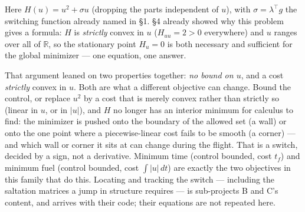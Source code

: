 \documentclass[11pt]{article}
\newcommand{\R}{\mathbb{R}}
\begin{document}
\begin{rig}
Here $H(u) = u^2 + \sigma u$ (dropping the parts independent of $u$), with
$\sigma = \lambda^\top g$ the switching function already named in \S1. \S4
already showed why this problem gives a formula: $H$ is \emph{strictly}
convex in $u$ ($H_{uu}=2>0$ everywhere) and $u$ ranges over all of $\R$, so
the stationary point $H_u=0$ is both necessary and sufficient for the
global minimizer --- one equation, one answer.

That argument leaned on two properties together: \emph{no bound on $u$},
and a cost \emph{strictly} convex in $u$. Both are what a different
objective can change. Bound the control, or replace $u^2$ by a cost that is
merely convex rather than strictly so (linear in $u$, or in $|u|$), and $H$
no longer has an interior minimum for calculus to find: the minimizer is
pushed onto the boundary of the allowed set (a wall) or onto the one point
where a piecewise-linear cost fails to be smooth (a corner) --- and which
wall or corner it sits at can change during the flight. That is a switch,
decided by a sign, not a derivative. Minimum time (control bounded, cost
$t_f$) and minimum fuel (control bounded, cost $\int|u|\,dt$) are exactly
the two objectives in this family that do this. Locating and tracking the
switch --- including the saltation matrices a jump in structure requires
--- is sub-projects B and C's content, and arrives with their code; their
equations are not repeated here.
\end{rig}
\end{document}
